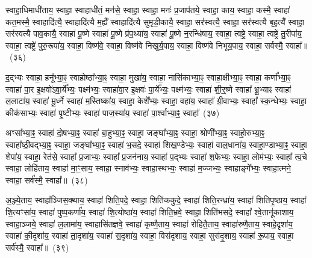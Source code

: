 {\anuvakamend[{ब्रा॒ह्म॒णेनैक॑ञ्च}]}%

स्वाहा॒धिमाधी॑ताय॒ स्वाहा॒ स्वाहाधी॑तं॒ मन॑से॒ स्वाहा॒ स्वाहा॒ मनः॑ प्र॒जा\-प॑तये॒ स्वाहा॒ काय॒ स्वाहा॒ कस्मै॒ स्वाहा॑ कत॒मस्मै॒ स्वाहादि॑त्यै॒ स्वाहादि॑त्यै म॒ह्यै᳚ स्वाहादि॑त्यै सुमृडी॒कायै॒ स्वाहा॒ सर॑स्वत्यै॒ स्वाहा॒ सर॑स्वत्यै बृह॒त्यै᳚ स्वाहा॒ सर॑स्वत्यै पाव॒कायै॒ स्वाहा॑ पू॒ष्णे स्वाहा॑ पू॒ष्णे प्र॑प॒थ्या॑य॒ स्वाहा॑ पू॒ष्णे न॒रन्धि॑षाय॒ स्वाहा॒ त्वष्ट्रे॒ स्वाहा॒ त्वष्ट्रे॑ तु॒रीपा॑य॒ स्वाहा॒ त्वष्ट्रे॑ पुरु॒रूपा॑य॒ स्वाहा॒ विष्ण॑वे॒ स्वाहा॒ विष्ण॑वे निखुर्य॒पाय॒ स्वाहा॒ विष्ण॑वे निभूय॒पाय॒ स्वाहा॒ सर्वस्मै॒ स्वाहा᳚॥~(३६)\ip

{\anuvakamend[{पु॒रु॒रूपा॑य॒ स्वाहा॒ दश॑ च}]}%

द॒द्भ्यः स्वाहा॒ हनू᳚भ्या॒ꣴ॒ स्वाहोष्ठा᳚भ्या॒ꣴ॒ स्वाहा॒ मुखा॑य॒ स्वाहा॒ नासि॑काभ्या॒ꣴ॒ स्वाहा॒क्षीभ्या॒ꣴ॒ स्वाहा॒ कर्णा᳚भ्या॒ꣴ॒ स्वाहा॑ पा॒र इ॒क्षवो॑\-ऽवा॒र्ये᳚भ्यः॒ पक्ष्म॑भ्यः॒ स्वाहा॑वा॒र इ॒क्षवः॑ पा॒र्ये᳚भ्यः॒ पक्ष्म॑भ्यः॒ स्वाहा॑ शी॒र्॒\mbox{}ष्णे स्वाहा᳚ भ्रू॒भ्याꣴ स्वाहा॑ ल॒लाटा॑य॒ स्वाहा॑ मू॒र्ध्ने स्वाहा॑ म॒स्तिष्का॑य॒ स्वाहा॒ केशे᳚भ्यः॒ स्वाहा॒ वहा॑य॒ स्वाहा᳚ ग्री॒वाभ्यः॒ स्वाहा᳚ स्क॒न्धेभ्यः॒ स्वाहा॒ कीक॑साभ्यः॒ स्वाहा॑ पृ॒ष्टीभ्यः॒ स्वाहा॑ पाज॒स्या॑य॒ स्वाहा॑ पा॒र्श्वाभ्या॒ꣴ॒ स्वाहा᳚~(३७)\ip

अꣳसा᳚भ्या॒ꣴ॒ स्वाहा॑ दो॒षभ्या॒ꣴ॒ स्वाहा॑ बा॒हुभ्या॒ꣴ॒ स्वाहा॒ जङ्घा᳚भ्या॒ꣴ॒ स्वाहा॒ श्रोणी᳚भ्या॒ꣴ॒ स्वाहो॒रुभ्या॒ꣴ॒ स्वाहा᳚ष्ठी॒वद्भ्या॒ꣴ॒ स्वाहा॒ जङ्घा᳚भ्या॒ꣴ॒ स्वाहा॑ भ॒सदे॒ स्वाहा॑ शिख॒ण्डेभ्यः॒ स्वाहा॑ वाल॒धाना॑य॒ स्वाहा॒ण्डाभ्या॒ꣴ॒ स्वाहा॒ शेपा॑य॒ स्वाहा॒ रेत॑से॒ स्वाहा᳚ प्र॒जाभ्यः॒ स्वाहा᳚ प्र॒जन॑नाय॒ स्वाहा॑ प॒द्भ्यः स्वाहा॑ श॒फेभ्यः॒ स्वाहा॒ लोम॑भ्यः॒ स्वाहा᳚ त्व॒चे स्वाहा॒ लोहि॑ताय॒ स्वाहा॑ मा॒ꣳ॒साय॒ स्वाहा॒ स्नाव॑भ्यः॒ स्वाहा॒स्थभ्यः॒ स्वाहा॑ म॒ज्जभ्यः॒ स्वाहाङ्गे᳚भ्यः॒ स्वाहा॒त्मने॒ स्वाहा॒ सर्व॑स्मै॒ स्वाहा᳚॥~(३८)\ip

{\anuvakamend[{पा॒र्श्वाभ्या॒ꣴ॒ स्वाहा॑ म॒ज्जभ्यः॒ स्वाहा॒ षट्च॑}]}%

अ॒ञ्ज्ये॒ताय॒ स्वाहा᳚ञ्जिस॒क्थाय॒ स्वाहा॑ शिति॒पदे॒ स्वाहा॒ शिति॑ककुदे॒ स्वाहा॑ शिति॒रन्ध्रा॑य॒ स्वाहा॑ शितिपृ॒ष्ठाय॒ स्वाहा॑ शि॒त्यꣳसा॑य॒ स्वाहा॑ पुष्प॒कर्णा॑य॒ स्वाहा॑ शि॒त्योष्ठा॑य॒ स्वाहा॑ शिति॒भ्रवे॒ स्वाहा॒ शिति॑भसदे॒ स्वाहा᳚ श्वे॒तानू॑काशाय॒ स्वाहा॒ञ्जये॒ स्वाहा॑ ल॒लामा॑य॒ स्वाहासि॑तज्ञवे॒ स्वाहा॑ कृष्णै॒ताय॒ स्वाहा॑ रोहितै॒ताय॒ स्वाहा॑रुणै॒ताय॒ स्वाहे॒दृशा॑य॒ स्वाहा॑ की॒दृशा॑य॒ स्वाहा॑ ता॒दृशा॑य॒ स्वाहा॑ स॒दृशा॑य॒ स्वाहा॒ विस॑दृशाय॒ स्वाहा॒ सुस॑दृ॒शाय॒ स्वाहा॑ रू॒पाय॒ स्वाहा॒ सर्व॑स्मै॒ स्वाहा᳚॥~(३९)\ip

{\anuvakamend[{रू॒पाय॒ स्वाहा॒ द्वे च॑}]}%

